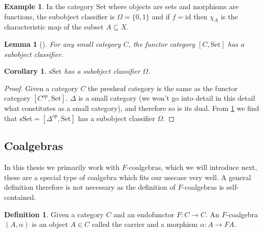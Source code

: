 \documentclass[12pt]{article}
\newtheorem{lemma}{Lemma}[section]
\newtheorem{corollary}{Corollary}[section]
\theoremstyle{definition}
\newtheorem{definition}{Definition}[section]
\newtheorem{example}{Example}[section]
\newcommand{\1}{\mathbbm{1}}
\newcommand{\id}{\text{id}}
\begin{document}
\begin{example}
    In the category $\mathrm{Set}$ where objects are sets and morphisms are functions, the subobject classifier is $\Omega = \{0,1\}$ and if $f = \id$ then $\chi_A$ is the characteristic map of the subset $A\subseteq X$.
\end{example}

\begin{lemma}[{\cite[Lemma.~1.6.5]{Elephant}}]\label{lem:exist-sub_class}
    For any small category $C$, the functor category $[C, \mathrm{Set}]$ has a subobject classifier.
\end{lemma}

\begin{corollary}
    $\mathrm{sSet}$ has a subobject classifier $\Omega$.
\end{corollary}

\begin{proof}
    Given a category $C$ the presheaf category is the same as the functor category $[C^{op}, \mathrm{Set}]$. $\Delta$ is a small category (we won't go into detail in this detail what constitutes as a small category), and therefore so is its dual. From \ref{lem:exist-sub_class} we find that $\mathrm{sSet} = [\Delta^{op}, \mathrm{Set}]$ has a subobject classifier $\Omega$.
\end{proof}

\subsection{Coalgebras}
In this thesis we primarily work with $F$-coalgebras, which we will introduce next, these are a special type of coalgebra which fits our usecase very well. A general definition therefore is not necessary as the definition of $F$-coalgebras is self-contained.

\begin{definition}
    Given a category $C$ and an endofunctor $F: C \to C$. An $F$-coalgebra $(A,\alpha)$ is an object $A\in C$ called the carrier and a morphism $\alpha: A\to FA$.
\end{definition}
\end{document}
